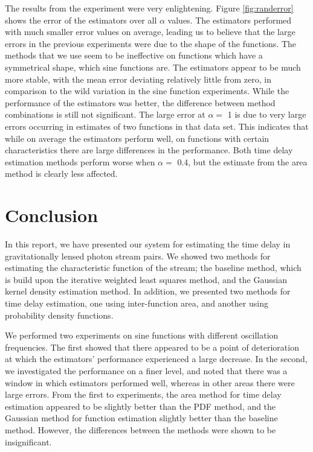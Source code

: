 \documentclass[a4paper,11pt]{article}
\begin{document}
The results from the experiment were very enlightening. Figure
\ref{fig:randerror} shows the error of the estimators over all $\alpha$
values. The estimators performed with much smaller error values on average,
leading us to believe that the large errors in the previous experiments were due
to the shape of the functions. The methods that we use seem to be ineffective on
functions which have a symmetrical shape, which sine functions are. The
estimators appear to be much more stable, with the mean error deviating
relatively little from zero, in comparison to the wild variation in the sine
function experiments. While the performance of the estimators was better, the
difference between method combinations is still not significant. The large error
at $\alpha=$ 1 is due to very large errors occurring in estimates of two
functions in that data set. This indicates that while on average the estimators
perform well, on functions with certain characteristics there are large
differences in the performance. Both time delay estimation methods perform worse
when $\alpha=$ 0.4, but the estimate from the area method is clearly less
affected.
\section{Conclusion}
\label{sec-8}

In this report, we have presented our system for estimating the time delay in
gravitationally lensed photon stream pairs. We showed two methods for estimating
the characteristic function of the stream; the baseline method, which is build
upon the iterative weighted least squares method, and the Gaussian kernel
density estimation method. In addition, we presented two methods for time delay
estimation, one using inter-function area, and another using probability density
functions. 

We performed two experiments on sine functions with different
oscillation frequencies. The first showed that there appeared to be a point of
deterioration at which the estimators' performance experienced a large
decrease. In the second, we investigated the performance on a finer level, and
noted that there was a window in which estimators performed well, whereas in
other areas there were large errors. From the first to experiments, the area
method for time delay estimation appeared to be slightly better than the PDF
method, and the Gaussian method for function estimation slightly better than the
baseline method. However, the differences between the methods were shown to be
insignificant. 
\end{document}
